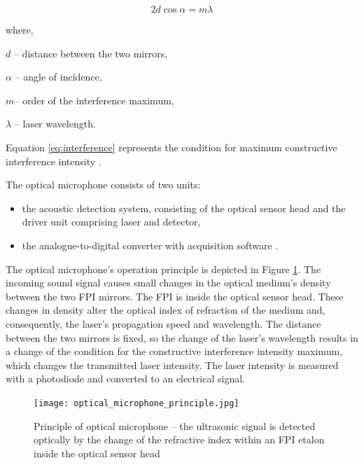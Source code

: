 \documentclass[sn-nature]{sn-jnl}%
\theoremstyle{thmstyleone}%
\theoremstyle{thmstyletwo}%
\theoremstyle{thmstylethree}%
\begin{document}
    \begin{equation}
    2d\cos\alpha = m\lambda
    \label{eq:interference}
    \end{equation}

    where,

    \begin{unenumerate}
        \item $d$ -- distance between the two mirrors,
        \item $\alpha$ -- angle of incidence,
        \item $m$-- order of the interference maximum,
        \item $\lambda$ -- laser wavelength.
    \end{unenumerate}  

    Equation \ref{eq:interference} represents the condition for maximum constructive interference intensity \cite{fpi}.

     The optical microphone consists of two units:

    \begin{itemize}
        \item the acoustic detection system, consisting of the optical sensor head and the driver unit comprising laser and detector,
        \item the analogue-to-digital converter with acquisition software \cite{fischer_rohringer_panzer_hecker_2017}.
    \end{itemize}

    The optical microphone's operation principle is depicted in Figure \ref{fig:optical_microphone_principle}. The incoming sound signal causes small changes in the optical medium's density between the two FPI mirrors. The FPI is inside the optical sensor head. These changes in density alter the optical index of refraction of the medium and, consequently, the laser’s propagation speed and wavelength. The distance between the two mirrors is fixed, so the change of the laser’s wavelength results in a change of the condition for the constructive interference intensity maximum, which changes the transmitted laser intensity. The laser intensity is measured with a photodiode and converted to an electrical signal.

    
    \begin{figure}[h!]
        \centering
        \texttt{[image: optical\_microphone\_principle.jpg]}
        \caption{Principle of optical microphone -- the ultrasonic signal is detected optically by the change of the refractive index within an FPI etalon inside the optical sensor head \cite{fischer_rohringer_panzer_hecker_2017}}
        \label{fig:optical_microphone_principle}
    \end{figure}
\end{document}
